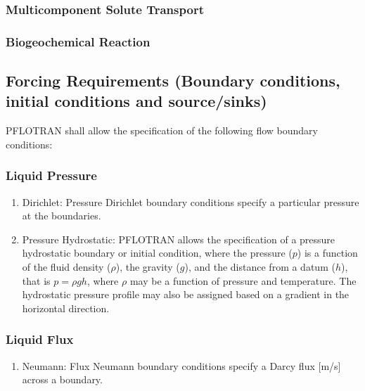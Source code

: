 \subsubsection{Multicomponent Solute Transport}
\subsubsection{Biogeochemical Reaction}

\subsection{Forcing Requirements (Boundary conditions, initial conditions and source/sinks)}
PFLOTRAN shall allow the specification of the following flow boundary conditions:


\subsubsection{Liquid Pressure}
\begin{enumerate}[label=FR \arabic*.,ref=FR \arabic*,nosep]
	\item Dirichlet: \label{dirichlet} Pressure Dirichlet boundary conditions specify a particular pressure at the boundaries. 
	\item Pressure Hydrostatic: \label{presHyd} PFLOTRAN allows the specification of a pressure hydrostatic boundary or initial condition, where the pressure ($p$) is a function of the fluid density ($\rho$), the gravity ($g$), and the distance from a datum ($h$), that is $p= \rho gh$, where $\rho$ may be a function of pressure and temperature. The hydrostatic pressure profile may also be assigned based on a gradient in the horizontal direction.
\end{enumerate}

\subsubsection{Liquid Flux}
\begin{enumerate}[label=FR \arabic*.,ref=FR \arabic*,nosep, resume]
	\item Neumann: \label{neumann} Flux Neumann boundary conditions specify a Darcy flux [m/s] across a boundary.

\end{enumerate}

